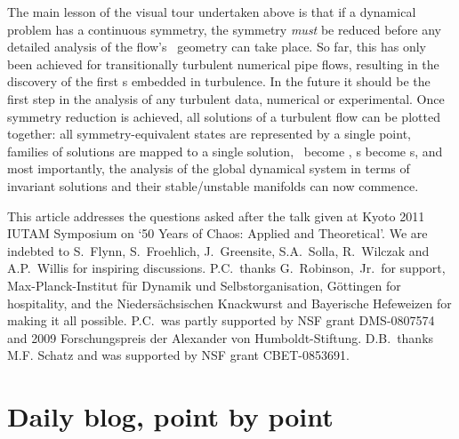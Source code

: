 \documentclass[aip,cha,reprint,
secnumarabic,
nofootinbib, tightenlines,
nobibnotes, showkeys, showpacs,
groupedaddress
]{revtex4-1}
\begin{document}
The main lesson of the visual tour undertaken above is that if a
dynamical problem has a continuous symmetry, the symmetry \emph{must} be
reduced before any detailed analysis of the flow's \statesp\ geometry can
take place. So far, this has only been achieved for transitionally
turbulent numerical pipe flows, resulting in the discovery of
the first \rpo s embedded in turbulence. In the future it should be the
first step in the analysis of any turbulent data, numerical or
experimental. Once symmetry reduction is achieved, all
solutions of a turbulent flow can be plotted together: all
symmetry-equivalent states are represented by a single point, families of
solutions are mapped to a single solution, \reqva\ become \eqva, \rpo s
become \po s, and most importantly, the analysis of the global dynamical
system in terms of invariant solutions and their stable/unstable
manifolds can now commence.

\begin{acknowledgments}
This article addresses the questions asked after the talk given at
Kyoto 2011 IUTAM Symposium on `50 Years of Chaos: Applied and Theoretical'.
We are indebted to
S.~Flynn,
S.~Froehlich,
J.~Greensite,
S.A.~Solla,
R.~Wilczak
and
A.P.~Willis
for inspiring discussions.
P.C.\ thanks G.~Robinson,~Jr.\ for support,
Max-Planck-Institut f\"ur Dynamik und Selbstorganisation,
G\"ottingen for hospitality,
and the Nieders\"achsischen Knackwurst and Bayerische Hefeweizen for
making it all possible.
P.C.\ was partly supported by NSF grant DMS-0807574
and
2009 Forschungspreis der Alexander von Humboldt-Stiftung.
D.B.\ thanks M.F. Schatz and was supported by NSF grant CBET-0853691.
\end{acknowledgments}





\ifdraft
    \onecolumngrid

    \newpage

    \newpage

    \newpage
    \section{Daily blog, point by point}
    \label{chap:atlas}

\fi
\end{document}
